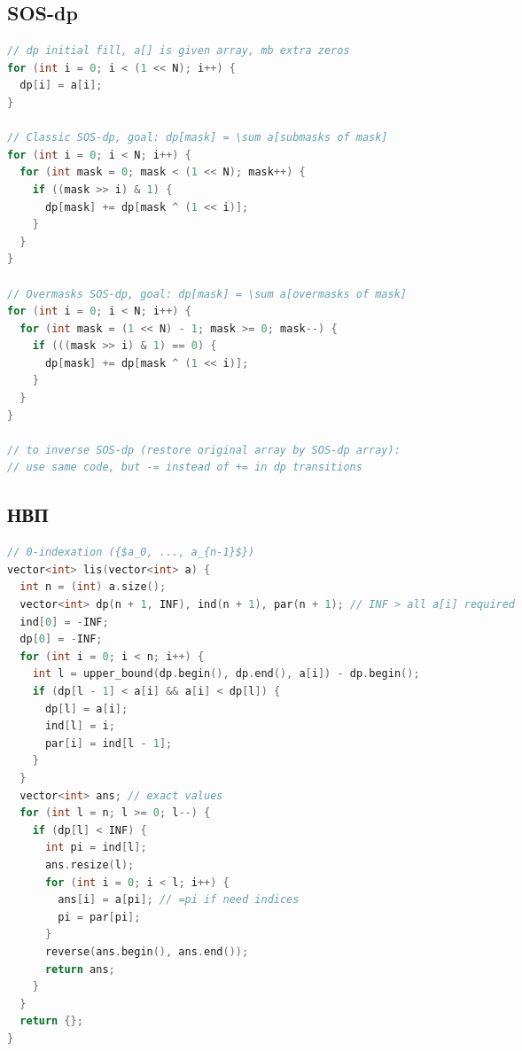 \documentclass[10pt,a4paper,landscape,twosided]{extarticle}
\begin{document}
\begin{multicols*}{3}
\begin{lstlisting}[language=C++]
\end{lstlisting}

\subsection{SOS-dp}
\begin{lstlisting}[language=C++]
// dp initial fill, a[] is given array, mb extra zeros
for (int i = 0; i < (1 << N); i++) {
  dp[i] = a[i];
}

// Classic SOS-dp, goal: dp[mask] = \sum a[submasks of mask]
for (int i = 0; i < N; i++) {
  for (int mask = 0; mask < (1 << N); mask++) {
    if ((mask >> i) & 1) {
      dp[mask] += dp[mask ^ (1 << i)];
    }
  }
}

// Overmasks SOS-dp, goal: dp[mask] = \sum a[overmasks of mask]
for (int i = 0; i < N; i++) {
  for (int mask = (1 << N) - 1; mask >= 0; mask--) {
    if (((mask >> i) & 1) == 0) {
      dp[mask] += dp[mask ^ (1 << i)];
    }
  }
}

// to inverse SOS-dp (restore original array by SOS-dp array):
// use same code, but -= instead of += in dp transitions
\end{lstlisting}

\subsection{НВП}
\begin{lstlisting}[language=C++]
// 0-indexation ({$a_0, ..., a_{n-1}$})
vector<int> lis(vector<int> a) {
  int n = (int) a.size();
  vector<int> dp(n + 1, INF), ind(n + 1), par(n + 1); // INF > all a[i] required
  ind[0] = -INF;
  dp[0] = -INF;
  for (int i = 0; i < n; i++) {
    int l = upper_bound(dp.begin(), dp.end(), a[i]) - dp.begin();
    if (dp[l - 1] < a[i] && a[i] < dp[l]) {
      dp[l] = a[i];
      ind[l] = i;
      par[i] = ind[l - 1];
    }
  }
  vector<int> ans; // exact values
  for (int l = n; l >= 0; l--) {
    if (dp[l] < INF) {
      int pi = ind[l];
      ans.resize(l);
      for (int i = 0; i < l; i++) {
        ans[i] = a[pi]; // =pi if need indices
        pi = par[pi];
      }
      reverse(ans.begin(), ans.end());
      return ans;
    }
  }
  return {};
}
\end{lstlisting}


\end{multicols*}
\end{document}
